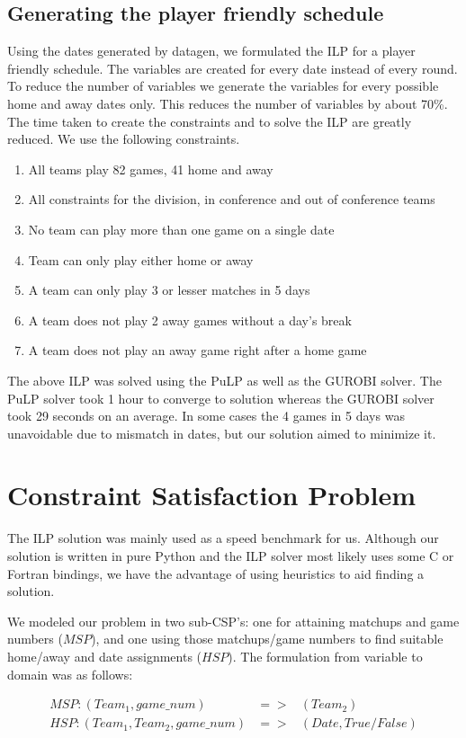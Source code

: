\documentclass{article}
\begin{document}
	\subsection{Generating the player friendly schedule}
	Using the dates generated by datagen, we formulated the ILP for a player friendly schedule. The variables are created for every date instead of every round.  To reduce the number of variables we generate the variables for every possible home and away dates only. This reduces the number of variables by about 70\%. The time taken to create the constraints and to solve the ILP are greatly reduced. We use the following constraints.
	\begin{enumerate}
		\item All teams play 82 games, 41 home and away
		\item All constraints for the division, in conference and out of conference teams
		\item No team can play more than one game on a single date
		\item Team can only play either home or away
		\item A team can only play 3 or lesser matches in 5 days
		\item A team does not play 2 away games without a day's break
		\item A team does not play an away game right after a home game
	\end{enumerate}
	The above ILP was solved using the PuLP as well as the GUROBI solver. The PuLP solver took 1 hour to converge to solution whereas the GUROBI solver took 29 seconds on an average. In some cases the 4 games in 5 days was unavoidable due to mismatch in dates, but our solution aimed to minimize it.

	\section{Constraint Satisfaction Problem}
	The ILP solution was mainly used as a speed benchmark for us. Although our solution is written in pure Python and the ILP solver most likely uses some C or Fortran bindings, we have the advantage of using heuristics to aid finding a solution.

	We modeled our problem in two sub-CSP's: one for attaining matchups and game numbers ($MSP$), and one using those matchups/game numbers to find suitable home/away and date assignments ($HSP$). The formulation from variable to domain was as follows:

	\begin{eqnarray*}
		MSP: (Team_1, game\_num) &=>& (Team_2) \\
		HSP: (Team_1, Team_2, game\_num) &=>& (Date, True/False)
	\end{eqnarray*}
\end{document}
